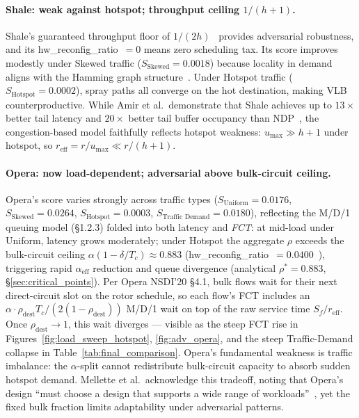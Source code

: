 \documentclass{article}
\begin{document}
    \paragraph{Shale: weak against hotspot; throughput ceiling $1/(h{+}1)$.}
    Shale's guaranteed throughput floor of $1/(2h)$~\cite{shale} provides adversarial robustness, and its hw\_reconfig\_ratio~$=0$ means zero scheduling tax.  Its score improves modestly under Skewed traffic ($S_{\text{Skewed}}=0.0018$) because locality in demand aligns with the Hamming graph structure~\cite{shale}.  Under Hotspot traffic ($S_{\text{Hotspot}}=0.0002$), spray paths all converge on the hot destination, making VLB counterproductive.  While Amir et al.\ demonstrate that Shale achieves up to $13\times$ better tail latency and $20\times$ better tail buffer occupancy than NDP~\cite{shale}, the congestion-based model faithfully reflects hotspot weakness: $u_{\max} \gg h{+}1$ under hotspot, so $r_{\text{eff}}=r/u_{\max} \ll r/(h{+}1)$.

    \paragraph{Opera: now load-dependent; adversarial above bulk-circuit ceiling.}
    Opera's score varies strongly across traffic types ($S_{\text{Uniform}}=0.0176$, $S_{\text{Skewed}}=0.0264$, $S_{\text{Hotspot}}=0.0003$, $S_{\text{Traffic Demand}}=0.0180$), reflecting the M/D/1 queuing model (\S1.2.3) folded into both latency and \emph{FCT}: at mid-load under Uniform, latency grows moderately; under Hotspot the aggregate $\rho$ exceeds the bulk-circuit ceiling $\alpha(1-\delta/T_c)\approx0.883$ (hw\_reconfig\_ratio~$=0.0400$~\cite{opera}), triggering rapid $\alpha_{\text{eff}}$ reduction and queue divergence (analytical $\rho^*=0.883$, \S\ref{sec:critical_points}).  Per Opera NSDI'20 §4.1, bulk flows wait for their next direct-circuit slot on the rotor schedule, so each flow's FCT includes an $\alpha \cdot \rho_{\text{dest}} T_c / (2(1-\rho_{\text{dest}}))$ M/D/1 wait on top of the raw service time $S_f / r_{\text{eff}}$.  Once $\rho_{\text{dest}} \to 1$, this wait diverges --- visible as the steep FCT rise in Figures~\ref{fig:load_sweep_hotspot}, \ref{fig:adv_opera}, and the steep Traffic-Demand collapse in Table~\ref{tab:final_comparison}.  Opera's fundamental weakness is traffic imbalance: the $\alpha$-split cannot redistribute bulk-circuit capacity to absorb sudden hotspot demand.  Mellette et al.\ acknowledge this tradeoff, noting that Opera's design ``must choose a design that supports a wide range of workloads''~\cite{opera}, yet the fixed bulk fraction limits adaptability under adversarial patterns.
\end{document}
